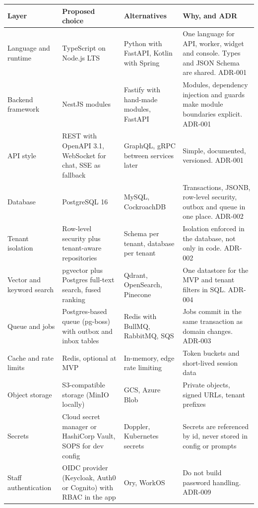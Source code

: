 {\small
\begin{longtable}{@{}>{\raggedright\arraybackslash}p{}>{\raggedright\arraybackslash}p{}>{\raggedright\arraybackslash}p{}>{\raggedright\arraybackslash}p{}@{}}
\toprule
\textbf{Layer} & \textbf{Proposed choice} & \textbf{Alternatives} & \textbf{Why, and ADR} \\
\midrule
\endhead
\bottomrule
\endfoot
Language and runtime & TypeScript on Node.js LTS & Python with FastAPI, Kotlin with Spring & One language for API, worker, widget and console. Types and JSON Schema are shared. ADR-001 \\
Backend framework & NestJS modules & Fastify with hand-made modules, FastAPI & Modules, dependency injection and guards make module boundaries explicit. ADR-001 \\
API style & REST with OpenAPI 3.1, WebSocket for chat, SSE as fallback & GraphQL, gRPC between services later & Simple, documented, versioned. ADR-001 \\
Database & PostgreSQL 16 & MySQL, CockroachDB & Transactions, JSONB, row-level security, outbox and queue in one place. ADR-002 \\
Tenant isolation & Row-level security plus tenant-aware repositories & Schema per tenant, database per tenant & Isolation enforced in the database, not only in code. ADR-002 \\
Vector and keyword search & pgvector plus Postgres full-text search, fused ranking & Qdrant, OpenSearch, Pinecone & One datastore for the MVP and tenant filters in SQL. ADR-004 \\
Queue and jobs & Postgres-based queue (pg-boss) with outbox and inbox tables & Redis with BullMQ, RabbitMQ, SQS & Jobs commit in the same transaction as domain changes. ADR-003 \\
Cache and rate limits & Redis, optional at MVP & In-memory, edge rate limiting & Token buckets and short-lived session data \\
Object storage & S3-compatible storage (MinIO locally) & GCS, Azure Blob & Private objects, signed URLs, tenant prefixes \\
Secrets & Cloud secret manager or HashiCorp Vault, SOPS for dev config & Doppler, Kubernetes secrets & Secrets are referenced by id, never stored in config or prompts \\
Staff authentication & OIDC provider (Keycloak, Auth0 or Cognito) with RBAC in the app & Ory, WorkOS & Do not build password handling. ADR-009 \\

\end{longtable}}
